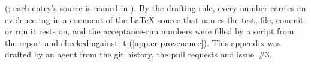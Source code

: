 \begin{description}
(; each entry's source is named in
).
By the drafting rule, every number carries an evidence tag in a comment of the \LaTeX{} source that
names the test, file, commit or run it rests on, and the acceptance-run numbers were filled by a
script from the report and checked against it (\cref{app:cr-provenance}).
This appendix was drafted by an agent from the git history, the pull requests and issue~\#3.
\end{description}

